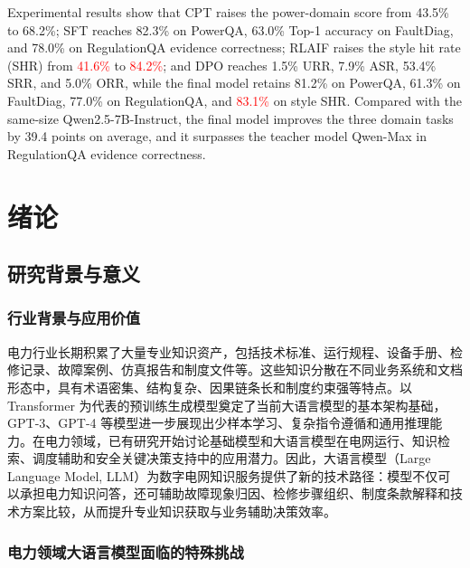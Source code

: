 \documentclass[fontset=fandol,type=master,campus=shenzhen,etitleauto=true]{hithesisbook}
\newcommand{\rev}[1]{\textcolor{red}{#1}}
\begin{document}
\begin{eabstract}
Experimental results show that CPT raises the power-domain score from 43.5\% to 68.2\%; SFT reaches 82.3\% on PowerQA, 63.0\% Top-1 accuracy on FaultDiag, and 78.0\% on RegulationQA evidence correctness; RLAIF raises the style hit rate (SHR) from \rev{41.6\%} to \rev{84.2\%}; and DPO reaches 1.5\% URR, 7.9\% ASR, 53.4\% SRR, and 5.0\% ORR, while the final model retains 81.2\% on PowerQA, 61.3\% on FaultDiag, 77.0\% on RegulationQA, and \rev{83.1\%} on style SHR. Compared with the same-size Qwen2.5-7B-Instruct, the final model improves the three domain tasks by 39.4 points on average, and it surpasses the teacher model Qwen-Max in RegulationQA evidence correctness.
\end{eabstract}

\makecover
\tableofcontents

\mainmatter
\chapter{绪论}\label{ux7eeaux8bba}

\section{研究背景与意义}\label{ux7814ux7a76ux80ccux666fux4e0eux610fux4e49}

\subsection{行业背景与应用价值}

电力行业长期积累了大量专业知识资产，包括技术标准、运行规程、设备手册、检修记录、故障案例、仿真报告和制度文件等。这些知识分散在不同业务系统和文档形态中，具有术语密集、结构复杂、因果链条长和制度约束强等特点。以 Transformer 为代表的预训练生成模型奠定了当前大语言模型的基本架构基础\cite{ref1}，GPT-3、GPT-4 等模型进一步展现出少样本学习、复杂指令遵循和通用推理能力\cite{ref2,ref3}。在电力领域，已有研究开始讨论基础模型和大语言模型在电网运行、知识检索、调度辅助和安全关键决策支持中的应用潜力\cite{ref4,ref5}。因此，大语言模型（Large Language Model, LLM）为数字电网知识服务提供了新的技术路径：模型不仅可以承担电力知识问答，还可辅助故障现象归因、检修步骤组织、制度条款解释和技术方案比较，从而提升专业知识获取与业务辅助决策效率。

\subsection{电力领域大语言模型面临的特殊挑战}
\end{document}
